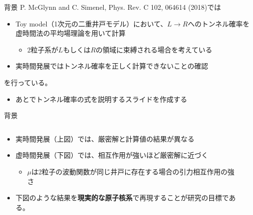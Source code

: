 \documentclass[11pt,aspectratio=169,xcolor=dvipsnames,table,dvipdfmx]{beamer}
\theoremstyle{definition}
\begin{document}
\begin{frame}{背景}
  P. McGlynn and C. Simenel, Phys. Rev. C 102, 064614 (2018)では
  \begin{itemize}
    \item Toy model（1次元の二重井戸モデル）において、$L\to R$へのトンネル確率を虚時間法の平均場理論を用いて計算
    \begin{itemize}
      \item 2粒子系が$L$もしくは$R$の領域に束縛される場合を考えている
    \end{itemize}
    \item 実時間発展ではトンネル確率を正しく計算できないことの確認
  \end{itemize}
  を行っている。
  \begin{center}
  \end{center}
  \begin{itemize}
    \item あとでトンネル確率の式を説明するスライドを作成する
  \end{itemize}
\end{frame}

\begin{frame}{背景}
  \begin{columns}[t]
    \begin{column}{.5\textwidth}
      \begin{itemize}
        \item 実時間発展（上図）では、{\color{blue}厳密解}と{\color{orange}計算値}の結果が異なる
        \item 虚時間発展（下図）では、相互作用が強いほど{\color{blue}厳密解}に近づく
        \begin{itemize}
          \item $\mu$は2粒子の波動関数が同じ井戸に存在する場合の引力相互作用の強さ
        \end{itemize}
        \item 下図のような結果を\textbf{現実的な原子核系}で再現することが研究の目標である。
      \end{itemize}
    \end{column}
    \begin{column}{.5\textwidth}
    \end{column}
  \end{columns}
\end{frame}
\end{document}
